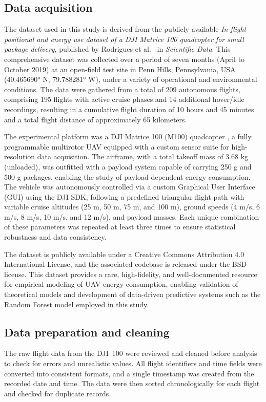 \subsection{Data acquisition}
The dataset used in this study is derived from the publicly available \textit{In-flight positional and energy use dataset of a DJI Matrice 100 quadcopter for small package delivery}, published by Rodrigues et al.~\cite{rodrigues2021} in \textit{Scientific Data}. This comprehensive dataset was collected over a period of seven months (April to October 2019) at an open-field test site in Penn Hills, Pennsylvania, USA (40.465690° N, 79.788281° W), under a variety of operational and environmental conditions. The data were gathered from a total of 209 autonomous flights, comprising 195 flights with active cruise phases and 14 additional hover/idle recordings, resulting in a cumulative flight duration of 10 hours and 45 minutes and a total flight distance of approximately 65 kilometers.

The experimental platform was a DJI Matrice 100 (M100) quadcopter \cite{dji2016}, a fully programmable multirotor UAV equipped with a custom sensor suite for high-resolution data acquisition. The airframe, with a total takeoff mass of 3.68 kg (unloaded), was outfitted with a payload system capable of carrying 250 g and 500 g packages, enabling the study of payload-dependent energy consumption. The vehicle was autonomously controlled via a custom Graphical User Interface (GUI) using the DJI SDK, following a predefined triangular flight path with variable cruise altitudes (25 m, 50 m, 75 m, and 100 m), ground speeds (4 m/s, 6 m/s, 8 m/s, 10 m/s, and 12 m/s), and payload masses. Each unique combination of these parameters was repeated at least three times to ensure statistical robustness and data consistency.

The dataset is publicly available under a Creative Commons Attribution 4.0 International License, and the associated codebase is released under the BSD license. This dataset provides a rare, high-fidelity, and well-documented resource for empirical modeling of UAV energy consumption, enabling validation of theoretical models and development of data-driven predictive systems such as the Random Forest model employed in this study.

\subsection{Data preparation and cleaning}
The raw flight data from the DJI~100 were reviewed and cleaned before analysis to check for errors and unrealistic values. All flight identifiers and time fields were converted into consistent formats, and a single timestamp was created from the recorded date and time. The data were then sorted chronologically for each flight and checked for duplicate records.

